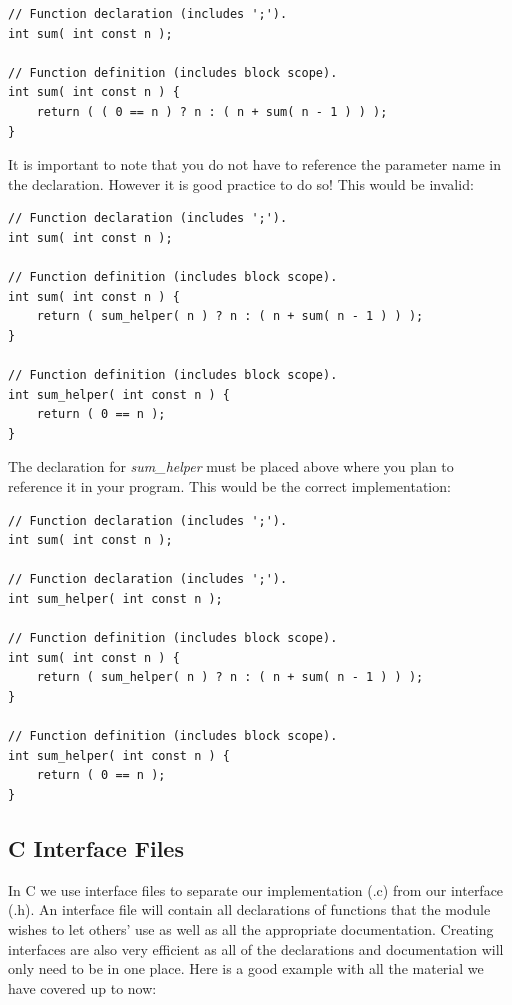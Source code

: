 \documentclass[12pt,extarticle]{article}
\begin{document}
\lstset {
	language=c
}
\begin{lstlisting}
// Function declaration (includes ';').
int sum( int const n );

// Function definition (includes block scope).
int sum( int const n ) {
	return ( ( 0 == n ) ? n : ( n + sum( n - 1 ) ) );
}
\end{lstlisting}

It is important to note that you do not have to reference the parameter name in the declaration. However it is good practice to do so! This would be invalid:\\

\lstset {
	language=c
}
\begin{lstlisting}
// Function declaration (includes ';').
int sum( int const n );

// Function definition (includes block scope).
int sum( int const n ) {
	return ( sum_helper( n ) ? n : ( n + sum( n - 1 ) ) );
}

// Function definition (includes block scope).
int sum_helper( int const n ) {
	return ( 0 == n );
}
\end{lstlisting}

The declaration for \emph{sum\_helper} must be placed above where you plan to reference it in your program. This would be the correct implementation:\\

\lstset {
	language=c
}
\begin{lstlisting}
// Function declaration (includes ';').
int sum( int const n );

// Function declaration (includes ';').
int sum_helper( int const n );

// Function definition (includes block scope).
int sum( int const n ) {
	return ( sum_helper( n ) ? n : ( n + sum( n - 1 ) ) );
}

// Function definition (includes block scope).
int sum_helper( int const n ) {
	return ( 0 == n );
}
\end{lstlisting}

\subsection{C Interface Files}

In C we use interface files to separate our implementation (.c) from our interface (.h). An interface file will contain all declarations of functions that the module wishes to let others' use as well as all the appropriate documentation. Creating interfaces are also very efficient as all of the declarations and documentation will only need to be in one place. Here is a good example with all the material we have covered up to now:\\
\end{document}

